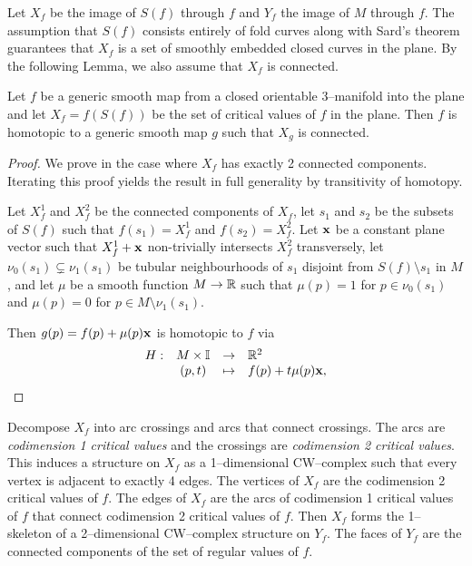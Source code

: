 Let $X_f$ be the image of $S(f)$ through $f$ and $Y_f$ the image of $M$ through $f$.
The assumption that $S(f)$ consists entirely of fold curves along with Sard's theorem guarantees that $X_f$ is a set of smoothly embedded closed curves in the plane.
By the following Lemma, we also assume that $X_f$ is connected.

\begin{lem}
	Let $f$ be a generic smooth map from a closed orientable 3--manifold into the plane and let $X_f=f(S(f))$ be the set of critical values of $f$ in the plane.
	Then $f$ is homotopic to a generic smooth map $g$ such that $X_g$ is connected.
\end{lem}

\begin{proof}
	We prove in the case where $X_f$ has exactly 2 connected components.
	Iterating this proof yields the result in full generality by transitivity of homotopy.
	
	Let $X_f^1$ and $X_f^2$ be the connected components of $X_f$, let $s_1$ and $s_2$ be the subsets of $S(f)$ such that $f(s_1)=X_f^1$ and $f(s_2)=X_f^2$.
	Let ${\bf x}$ be a constant plane vector such that $X_f^1+{\bf x}$ non-trivially intersects $X_f^2$ transversely, let $\nu_0(s_1)\subsetneq\nu_1(s_1)$ be tubular neighbourhoods of $s_1$ disjoint from $S(f)\setminus s_1$ in $M$, and let $\mu$ be a smooth function $M\to\mathbb{R}$ such that $\mu(p)=1$ for $p\in\nu_0(s_1)$ and $\mu(p)=0$ for $p\in M\setminus\nu_1(s_1)$.
	
	Then $g(p)=f(p)+\mu(p){\bf x}$ is homotopic to $f$ via
	\[
		\begin{array}{cccl}
			H: 	& M\times \mathbb{I} & \to & \mathbb{R}^2 \\
				& (p,t)	& \mapsto & f(p)+t\mu(p){\bf x},
		\end{array}
	\]
\end{proof}

Decompose $X_f$ into arc crossings and arcs that connect crossings.
The arcs are \emph{codimension 1 critical values} and the crossings are \emph{codimension 2 critical values}.
This induces a structure on $X_f$ as a 1--dimensional CW--complex such that every vertex is adjacent to exactly 4 edges.
The vertices of $X_f$ are the codimension 2 critical values of $f$.
The edges of $X_f$ are the arcs of codimension 1 critical values of $f$ that connect codimension 2 critical values of $f$.
Then $X_f$ forms the 1--skeleton of a 2--dimensional CW--complex structure on $Y_f$.
The faces of $Y_f$ are the connected components of the set of regular values of $f$.

